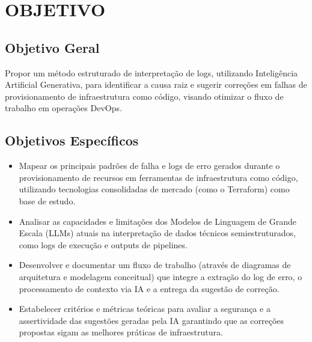 \section{OBJETIVO}

\subsection{Objetivo Geral}

Propor um método estruturado de interpretação de logs, utilizando Inteligência Artificial Generativa, para identificar a causa raiz e sugerir correções em falhas de provisionamento de infraestrutura como código, visando otimizar o fluxo de trabalho em operações DevOps.

\subsection{Objetivos Específicos}

\begin{itemize}
    \item Mapear os principais padrões de falha e logs de erro gerados durante o provisionamento de recursos em ferramentas de infraestrutura como código, utilizando tecnologias consolidadas de mercado (como o Terraform) como base de estudo.
    \item Analisar as capacidades e limitações dos Modelos de Linguagem de Grande Escala (LLMs) atuais na interpretação de dados técnicos semiestruturados, como logs de execução e outputs de pipelines.
    \item Desenvolver e documentar um fluxo de trabalho (através de diagramas de arquitetura e modelagem conceitual) que integre a extração do log de erro, o processamento de contexto via IA e a entrega da sugestão de correção.
    \item Estabelecer critérios e métricas teóricas para avaliar a segurança e a assertividade das sugestões geradas pela IA garantindo que as correções propostas sigam as melhores práticas de infraestrutura.
\end{itemize}

